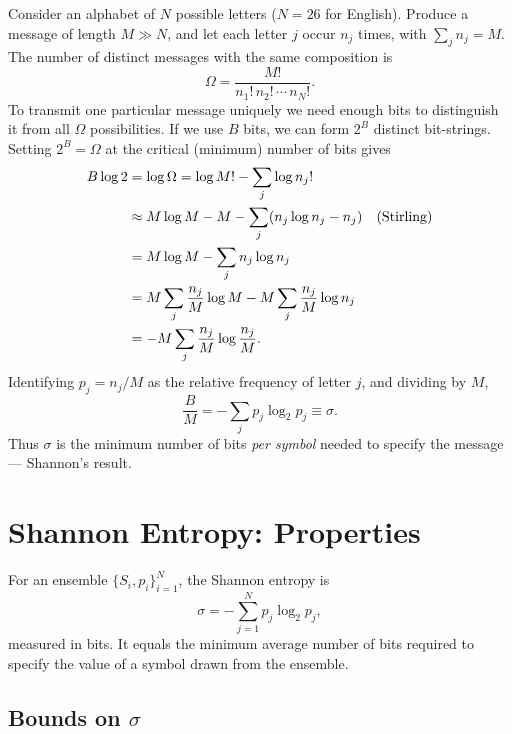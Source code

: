 Consider an alphabet of $N$ possible letters ($N = 26$ for English). Produce a message of length $M \gg N$, and let each letter $j$ occur $n_j$ times, with $\sum_j n_j = M$. The number of distinct messages with the same composition is
\begin{equation}
    \Omega = \frac{M!}{n_1!\, n_2!\, \cdots\, n_N!}.
\end{equation}
To transmit one particular message uniquely we need enough bits to distinguish it from all $\Omega$ possibilities. If we use $B$ bits, we can form $2^B$ distinct bit-strings. Setting $2^B = \Omega$ at the critical (minimum) number of bits gives
\begin{align}
    B \log 2 &= \log \Omega = \log M! - \sum_j \log n_j! \notag \\
    &\approx M\log M - M - \sum_j (n_j \log n_j - n_j) \quad \text{(Stirling)} \notag \\
    &= M\log M - \sum_j n_j \log n_j \notag \\
    &= M\sum_j \frac{n_j}{M}\log M - M\sum_j \frac{n_j}{M}\log n_j \notag \\
    &= -M\sum_j \frac{n_j}{M}\log\frac{n_j}{M}.
\end{align}
Identifying $p_j = n_j/M$ as the relative frequency of letter $j$, and dividing by $M$,
\begin{equation}
    \frac{B}{M} = -\sum_j p_j \log_2 p_j \equiv \sigma.
\end{equation}
Thus $\sigma$ is the minimum number of bits \emph{per symbol} needed to specify the message — Shannon's result.

\section{Shannon Entropy: Properties}

\begin{definition}
For an ensemble $\{S_i, p_i\}_{i=1}^{N}$, the Shannon entropy is
\begin{equation}
    \sigma = -\sum_{j=1}^{N} p_j \log_2 p_j,
\end{equation}
measured in bits. It equals the minimum average number of bits required to specify the value of a symbol drawn from the ensemble.
\end{definition}

\subsection{Bounds on $\sigma$}

